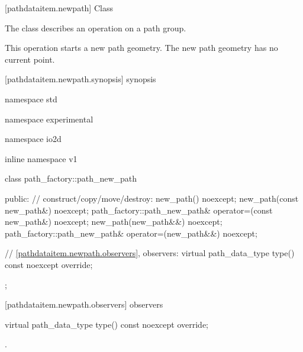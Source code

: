  [pathdataitem.newpath] {Class }

\pnum
{}
The class  describes an operation on a path group.

\pnum
This operation starts a new path geometry. The new path geometry has no current point.

 [pathdataitem.newpath.synopsis] { synopsis}

\begin{codeblock}
namespace std { namespace experimental { namespace io2d { inline namespace v1 {
  class path_factory::path_new_path {
  public:
    // construct/copy/move/destroy:
    new_path() noexcept;
    new_path(const new_path&) noexcept;
    path_factory::path_new_path& operator=(const new_path&) noexcept;
    new_path(new_path&&) noexcept;
    path_factory::path_new_path& operator=(new_path&&) noexcept;

    // \ref{pathdataitem.newpath.observers}, observers:
    virtual path_data_type type() const noexcept override;
  };
} } } }
\end{codeblock}

 [pathdataitem.newpath.observers]{ observers}

\begin{itemdecl}
    virtual path_data_type type() const noexcept override;
\end{itemdecl}
\begin{itemdescr}
	\pnum
	\returns
	.

\end{itemdescr}
